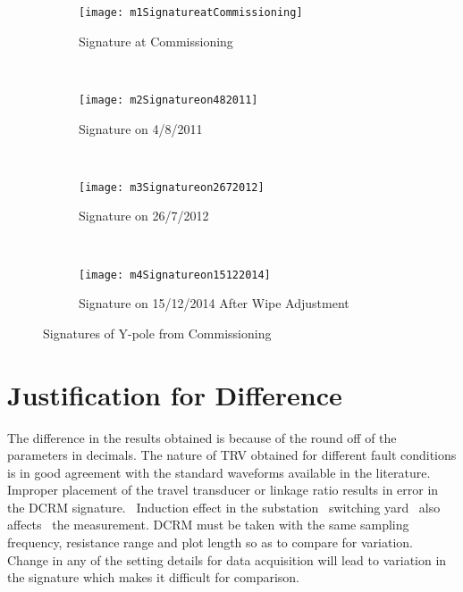\begin{figure}
    \centering
    \begin{subfigure}[b]{\textwidth}
        \centering
        \texttt{[image: m1SignatureatCommissioning]}
        \caption{Signature at Commissioning}
        \label{fig:Signature at Commissioning n}
    \end{subfigure}
    \\
    \begin{subfigure}[b]{\textwidth}
        \centering
        \texttt{[image: m2Signatureon482011]}
        \caption{Signature on 4/8/2011}
        \label{fig:Signature on 4/8/2011n}
    \end{subfigure}
    \\
    \begin{subfigure}[b]{\textwidth}
        \centering
        \texttt{[image: m3Signatureon2672012]}
        \caption{Signature on 26/7/2012}
        \label{fig:Signature on 26/7/2012n}
    \end{subfigure}
    \\
    \begin{subfigure}[b]{\textwidth}
        \centering
        \texttt{[image: m4Signatureon15122014]}
        \caption{Signature on 15/12/2014 After Wipe Adjustment}
        \label{fig:Signature on 15/12/2014 After Wipe Adjustment}
    \end{subfigure}
    
    \caption{Signatures of Y-pole from Commissioning}
    \label{fig:Signatures of Y-pole from Commissioning}
\end{figure}

\clearpage
\section{Justification for Difference}
The difference in the results obtained is because of the round off of the parameters in decimals. The nature of TRV obtained for different fault conditions is in good agreement with the standard waveforms available in the literature. Improper placement of the travel transducer or linkage ratio results in error in the DCRM signature. ~Induction effect in the substation ~switching yard ~also affects ~the measurement. DCRM must be taken with the same sampling frequency, resistance range and plot length so as to compare for variation. Change in any of the setting details for data acquisition will lead to variation in the signature which makes it difficult for comparison.